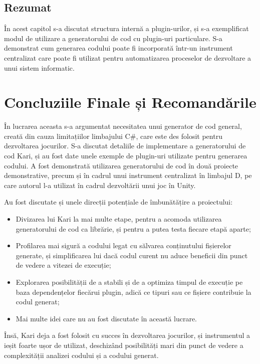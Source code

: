 \documentclass[a4paper,12pt]{report}
\begin{document}
\section{Rezumat}

În acest capitol s-a discutat structura internă a plugin-urilor, și s-a exemplificat modul de utilizare a generatorului de cod cu plugin-uri particulare.
S-a demonstrat cum generarea codului poate fi incorporată într-un instrument centralizat care poate fi utilizat pentru automatizarea proceselor de dezvoltare a unui sistem informatic.

\chapter*{Concluziile Finale și Recomandările}

În lucrarea aceasta s-a argumentat necesitatea unui generator de cod general, creată din cauza limitațiilor limbajului C\#, care este des folosit pentru dezvoltarea jocurilor.
S-a discutat detaliile de implementare a generatorului de cod Kari, și au fost date unele exemple de plugin-uri utilizate pentru generarea codului.
A fost demonstrată utilizarea generatorului de cod în două proiecte demonstrative, precum și în cadrul unui instrument centralizat în limbajul D, pe care autorul l-a utilizat în cadrul dezvoltării unui joc în Unity. 


Au fost discutate și unele direcții potențiale de îmbunătățire a proiectului:

\begin{itemize}
  \item Divizarea lui Kari la mai multe etape, pentru a acomoda utilizarea generatorului de cod ca librărie, și pentru a putea testa fiecare etapă aparte;
  \item Profilarea mai sigură a codului legat cu sălvarea conținutului fișierelor generate, și simplificarea lui dacă codul curent nu aduce beneficii din punct de vedere a vitezei de execuție;
  \item Explorarea posibilității de a stabili și de a optimiza timpul de execuție pe baza dependențelor fiecărui plugin, adică ce tipuri sau ce fișiere contribuie la codul generat;
  \item Mai multe idei care nu au fost discutate în această lucrare.
\end{itemize}

Însă, Kari deja a fost folosit cu succes în dezvoltarea jocurilor, și instrumentul a ieșit foarte ușor de utilizat, deschizând posibilități mari din punct de vedere a complexității analizei codului și a codului generat.
\end{document}
